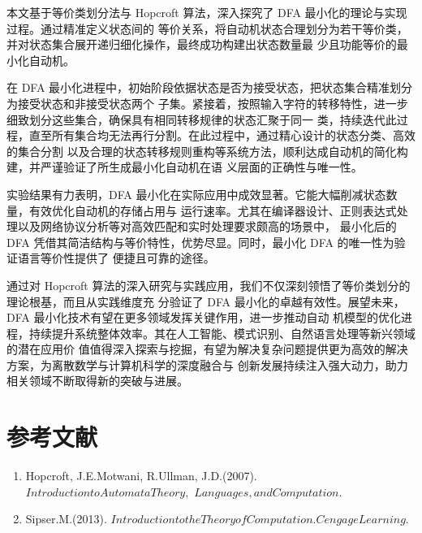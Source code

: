 \documentclass{article}
\begin{document}
本文基于等价类划分法与 Hopcroft 算法，深入探究了 DFA 最小化的理论与实现过程。通过精准定义状态间的
等价关系，将自动机状态合理划分为若干等价类，并对状态集合展开递归细化操作，最终成功构建出状态数量最
少且功能等价的最小化自动机。

在 DFA 最小化进程中，初始阶段依据状态是否为接受状态，把状态集合精准划分为接受状态和非接受状态两个
子集。紧接着，按照输入字符的转移特性，进一步细致划分这些集合，确保具有相同转移规律的状态汇聚于同一
类，持续迭代此过程，直至所有集合均无法再行分割。在此过程中，通过精心设计的状态分类、高效的集合分割
以及合理的状态转移规则重构等系统方法，顺利达成自动机的简化构建，并严谨验证了所生成最小化自动机在语
义层面的正确性与唯一性。

实验结果有力表明，DFA 最小化在实际应用中成效显著。它能大幅削减状态数量，有效优化自动机的存储占用与
运行速率。尤其在编译器设计、正则表达式处理以及网络协议分析等对高效匹配和实时处理要求颇高的场景中，
最小化后的 DFA 凭借其简洁结构与等价特性，优势尽显。同时，最小化 DFA 的唯一性为验证语言等价性提供了
便捷且可靠的途径。

通过对 Hopcroft 算法的深入研究与实践应用，我们不仅深刻领悟了等价类划分的理论根基，而且从实践维度充
分验证了 DFA 最小化的卓越有效性。展望未来，DFA 最小化技术有望在更多领域发挥关键作用，进一步推动自动
机模型的优化进程，持续提升系统整体效率。其在人工智能、模式识别、自然语言处理等新兴领域的潜在应用价
值值得深入探索与挖掘，有望为解决复杂问题提供更为高效的解决方案，为离散数学与计算机科学的深度融合与
创新发展持续注入强大动力，助力相关领域不断取得新的突破与进展。


\newpage
\section{参考文献}
\begin{enumerate}
    \item Hopcroft, J.E.Motwani, R.Ullman, J.D.(2007). $Introduction to Automata Theory,$ \newline$Languages, and Computation.$
    \item Sipser.M.(2013). $Introduction to the Theory of Computation. Cengage Learning.$
\end{enumerate}
\end{document}
